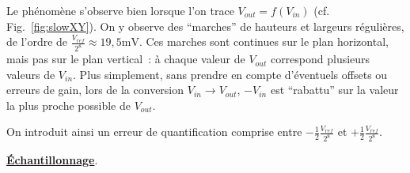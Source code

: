 \documentclass{article}
\begin{document}
Le phénomène s'observe bien lorsque l'on trace $V_{out}=f(V_{in})$ (cf. Fig.~\ref{fig:slowXY}). On y observe des ``marches'' de hauteurs et largeurs régulières, de l'ordre de $\frac{V_{ref}}{2^8}\approx\mathrm{19,5 mV}$. Ces marches sont continues sur le plan horizontal, mais pas sur le plan vertical~: à chaque valeur de $V_{out}$ correspond plusieurs valeurs de $V_{in}$. Plus simplement, sans prendre en compte d'éventuels offsets ou erreurs de gain, lors de la conversion $V_{in}\rightarrow V_{out}$, $-V_{in}$ est ``rabattu'' sur la valeur la plus proche possible de $V_{out}$.

On introduit ainsi un erreur de quantification comprise entre $-\frac{1}{2}\frac{V_{ref}}{2^8}$ et $+\frac{1}{2}\frac{V_{ref}}{2^8}$.



\noindent \textbf{\underline{Échantillonnage}}.
\end{document}
